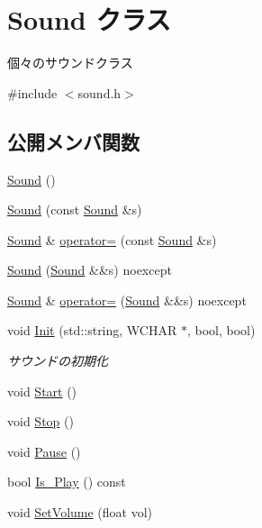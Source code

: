 \hypertarget{class_sound}{}\section{Sound クラス}
\label{class_sound}


個々のサウンドクラス  




{\ttfamily \#include $<$sound.\+h$>$}

\subsection*{公開メンバ関数}
\begin{DoxyCompactItemize}
\item 
\mbox{\hyperlink{class_sound_a539c205cdf06fe2c621fd77c37bcfac9}{Sound}} ()
\item 
\mbox{\hyperlink{class_sound_adbdf520a7124095c93390f43d78051ff}{Sound}} (const \mbox{\hyperlink{class_sound}{Sound}} \&s)
\item 
\mbox{\hyperlink{class_sound}{Sound}} \& \mbox{\hyperlink{class_sound_ada70bf358b8c2d20698709f2095d3dbc}{operator=}} (const \mbox{\hyperlink{class_sound}{Sound}} \&s)
\item 
\mbox{\hyperlink{class_sound_a4db406891d5b285ace544a52737c571a}{Sound}} (\mbox{\hyperlink{class_sound}{Sound}} \&\&s) noexcept
\item 
\mbox{\hyperlink{class_sound}{Sound}} \& \mbox{\hyperlink{class_sound_ae017eacf4168fc0d4d471f5768985ae2}{operator=}} (\mbox{\hyperlink{class_sound}{Sound}} \&\&s) noexcept
\item 
void \mbox{\hyperlink{class_sound_a341bf468ea414e896daf3a5f7937ee12}{Init}} (std\+::string, W\+C\+H\+AR $\ast$, bool, bool)
\begin{DoxyCompactList}\small\item\em サウンドの初期化 \end{DoxyCompactList}\item 
void \mbox{\hyperlink{class_sound_ae021b518e93d7d8c6f3ea951cd4b98d8}{Start}} ()
\item 
void \mbox{\hyperlink{class_sound_a188de6836d531813da378464e392e813}{Stop}} ()
\item 
void \mbox{\hyperlink{class_sound_a4e199b4346519a4977fe94998c4a77e7}{Pause}} ()
\item 
bool \mbox{\hyperlink{class_sound_a84149ac5b1c17bd66cf7fae4b9d59132}{Is\+\_\+\+Play}} () const
\item 
void \mbox{\hyperlink{class_sound_a993eee69f61611ca1b4621ea0952e2c8}{Set\+Volume}} (float vol)

\end{DoxyCompactItemize}
